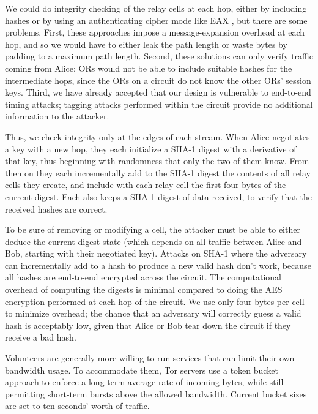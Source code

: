 \documentclass[times,10pt,twocolumn]{article}
\begin{document}
We could do integrity checking of the relay cells at each hop, either
by including hashes or by using an authenticating cipher mode like
EAX \cite{eax}, but there are some problems. First, these approaches
impose a message-expansion overhead at each hop, and so we would have to
either leak the path length or waste bytes by padding to a maximum
path length. Second, these solutions can only verify traffic coming
from Alice: ORs would not be able to include suitable hashes for
the intermediate hops, since the ORs on a circuit do not know the
other ORs' session keys. Third, we have already accepted that our design
is vulnerable to end-to-end timing attacks; tagging attacks performed
within the circuit provide no additional information to the attacker.

Thus, we check integrity only at the edges of each stream. When Alice
negotiates a key with a new hop, they each initialize a SHA-1
digest with a derivative of that key,
thus beginning with randomness that only the two of them know. From
then on they each incrementally add to the SHA-1 digest the contents of 
all relay cells they create, and include with each relay cell the
first four bytes of the current digest.  Each also keeps a SHA-1
digest of data received, to verify that the received hashes are correct.

To be sure of removing or modifying a cell, the attacker must be able
to either deduce the current digest state (which depends on all
traffic between Alice and Bob, starting with their negotiated key).
Attacks on SHA-1 where the adversary can incrementally add to a hash
to produce a new valid hash don't work, because all hashes are
end-to-end encrypted across the circuit.  The computational overhead
of computing the digests is minimal compared to doing the AES
encryption performed at each hop of the circuit. We use only four
bytes per cell to minimize overhead; the chance that an adversary will
correctly guess a valid hash
is
acceptably low, given that Alice or Bob tear down the circuit if they
receive a bad hash.

\label{subsec:rate-limit}

Volunteers are generally more willing to run services that can limit
their own bandwidth usage. To accommodate them, Tor servers use a
token bucket approach \cite{tannenbaum96} to 
enforce a long-term average rate of incoming bytes, while still
permitting short-term bursts above the allowed bandwidth. Current bucket
sizes are set to ten seconds' worth of traffic.
\end{document}
